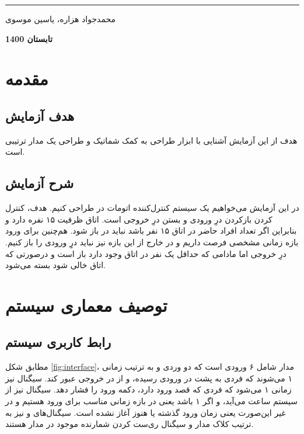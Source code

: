 \documentclass[12pt,onecolumn,a4paper,fleqn]{article}
\begin{document}
\begin{titlepage}
\begin{center}
			\noindent\rule[1ex]{\linewidth}{1pt}
			\vspace*{1.5cm}
			\begin{Large}
				محمدجواد هزاره، یاسین موسوی
				
				\vspace*{1.5cm}
				\textbf{
					تابستان 1400
				}
			\end{Large}			
		\end{center}
		\thispagestyle{empty}
	\end{titlepage}	
	\pagebreak
	
	\tableofcontents
	\thispagestyle{empty}
	\pagebreak
	\section{مقدمه}
	\subsection{هدف آزمایش}
	هدف از این آزمایش آشنایی با ابزار طراحی به کمک شماتیک و طراحی یک مدار ترتیبی است.
	\subsection{شرح آزمایش}
	در این آزمایش می‌خواهیم یک سیستم کنترل‌کننده اتومات در طراحی کنیم. هدف، کنترل کردن بازکردن درِ ورودی و بستن درِ خروجی است. اتاق ظرفیت ۱۵ نفره دارد و بنابراین اگر تعداد افراد حاضر در اتاق ۱۵ نفر باشد نباید در باز شود. هم‌چنین برای ورود بازه زمانی مشخصی فرصت داریم و در خارج از این بازه نیز نباید درِِ ورودی را باز کنیم.
	درِ خروجی اما مادامی که حداقل یک نفر در اتاق وجود دارد باز است و درصورتی که اتاق خالی شود بسته می‌شود.
	\pagebreak
	\section{توصیف معماری سیستم}
	\subsection{رابط کاربری سیستم}
	مطابق شکل \ref{fig:interface}، مدار شامل ۶ ورودی است که دو وردی
	و
	به ترتیب زمانی ۱ می‌شوند که فردی به پشت در ورودی رسیده، و از در خروجی عبور کند. سیگنال
	نیز زمانی ۱ می‌شود که فردی که قصد ورود دارد، دکمه ورود را فشار دهد. سیگنال
	نیز از سیستم ساعت می‌آید، و اگر ۱ باشد یعنی در بازه زمانی مناسب برای ورود هستیم و در غیر این‌صورت یعنی زمان ورود گذشته یا هنوز آغاز نشده است. سیگنال‌های 
	و
	نیز به ترتیب کلاک مدار و سیگنال ری‌ست کردن شمارنده موجود در مدار هستند.
	
\end{document}
